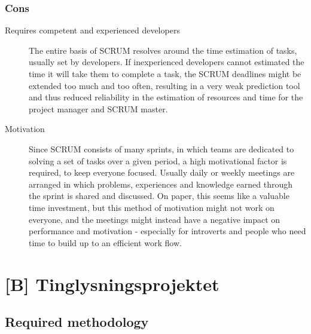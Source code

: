 \documentclass[11pt]{article}
\begin{document}
\begin{multicols}{2}
    \subsubsection{Cons}
    \begin{description}
        \item[Requires competent and experienced developers] The entire basis of SCRUM resolves around the time estimation of tasks, usually set by developers. If inexperienced developers cannot estimated the time it will take them to complete a task, the SCRUM deadlines might be extended too much and too often, resulting in a very weak prediction tool and thus reduced reliability in the estimation of resources and time for the project manager and SCRUM master.
        \item[Motivation] Since SCRUM consists of many sprints, in which teams are dedicated to solving a set of tasks over a given period, a high motivational factor is required, to keep everyone focused. Usually daily or weekly meetings are arranged in which problems, experiences and knowledge earned through the sprint is shared and discussed. On paper, this seems like a valuable time investment, but this method of motivation might not work on everyone, and the meetings might instead have a negative impact on performance and motivation - especially for introverts and people who need time to build up to an efficient work flow.
    \end{description}
    
\end{multicols}
\clearpage
\section{[B] Tinglysningsprojektet}
\label{sec:B}

\subsection{Required methodology}
\end{document}
